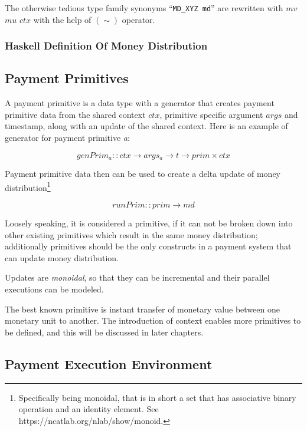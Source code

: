 The otherwise tedious type family synonyms ``\texttt{MD_XYZ md}'' are rewritten with $mv$
$mu$ $ctx$ with the help of $(\sim)$ operator.

\subsubsection{Haskell Definition Of Money Distribution}



\subsection{Payment Primitives}

A payment primitive is a data type with a generator that creates payment primitive data from the
shared context $ctx$, primitive specific argument $args$ and timestamp, along with an update of the
shared context. Here is an example of generator for payment primitive \textit{a}:

\begin{equation}
    genPrim_a :: ctx \rightarrow args_a \rightarrow t \rightarrow prim \times ctx
\end{equation}

Payment primitive data then can be used to create a delta update of money
distribution\footnote{Specifically being monoidal, that is in short a set that has associative
binary operation and an identity element. See https://ncatlab.org/nlab/show/monoid.}

\begin{equation}
    runPrim :: prim \rightarrow md
\end{equation}

Loosely speaking, it is considered a primitive, if it can not be broken down into other existing
primitives which result in the same money distribution; additionally primitives should be the only
constructs in a payment system that can update money distribution.

Updates are \textit{monoidal}, so that they can be incremental and their parallel executions can be
modeled.

The best known primitive is instant transfer of monetary value between one monetary unit to
another. The introduction of context enables more primitives to be defined, and this will be
discussed in later chapters.

\subsection{Payment Execution Environment}

